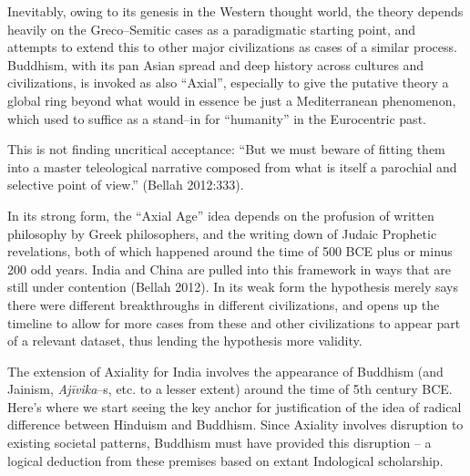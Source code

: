 Inevitably, owing to its genesis in the Western thought world, the theory depends heavily on the Greco–Semitic cases as a paradigmatic starting point, and attempts to extend this to other major civilizations as cases of a similar process. Buddhism, with its pan Asian spread and deep history across cultures and civilizations, is invoked as also “Axial”, especially to give the putative theory a global ring beyond what would in essence be just a Mediterranean phenomenon, which used to suffice as a stand–in for “humanity” in the Eurocentric past.

This is not finding uncritical acceptance: “But we must beware of fitting them into a master teleological narrative composed from what is itself a parochial and selective point of view.” (Bellah 2012:333).

In its strong form, the “Axial Age” idea depends on the profusion of written philosophy by Greek philosophers, and the writing down of Judaic Prophetic revelations, both of which happened around the time of 500 BCE plus or minus 200 odd years. India and China are pulled into this framework in ways that are still under contention (Bellah 2012). In its weak form the hypothesis merely says there were different breakthroughs in different civilizations, and opens up the timeline to allow for more cases from these and other civilizations to appear part of a relevant dataset, thus lending the hypothesis more validity.

The extension of Axiality for India involves the appearance of Buddhism (and Jainism, \textit{Ajīvika}–s, etc. to a lesser extent) around the time of 5th century BCE. Here’s where we start seeing the key anchor for justification of the idea of radical difference between Hinduism and Buddhism. Since Axiality involves disruption to existing societal patterns, Buddhism must have provided this disruption – a logical deduction from these premises based on extant Indological scholarship.

